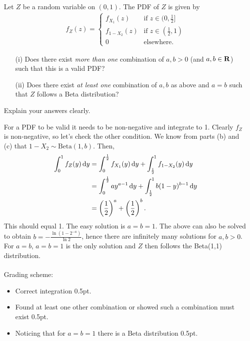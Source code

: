 \begin{exercise}[1.5]
Let $Z$ be a random variable on $(0,1)$. The PDF of $Z$ is given by
\begin{align*}
    f_Z(z) = \begin{cases}
    f_{X_1}(z)&\text{if}\,\,z\in (0,\frac12]\\
    f_{1-X_2}(z)&\text{if}\,\,z\in(\frac12,1)\\
    0 &\text{elsewhere}.
    \end{cases}
\end{align*}
\begin{enumerate}
\item[(i)] Does there exist \emph{more than one} combination of $a,b>0$ (and $a,b\in\bf{R}$) such that this is a valid PDF? 
\item[(ii)] Does there exist \emph{at least one} combination of $a,b$ as above and $a=b$ such that $Z$ follows a Beta distribution? 
\end{enumerate}
Explain your answers clearly.
\begin{solution}
For a PDF to be valid it needs to be non-negative and integrate to 1. Clearly $f_Z$ is non-negative, so let's check the other condition. We know from parts (b) and (c) that $1-X_2\sim\text{Beta}(1,b)$. Then,
\begin{align*}
    \int_{0}^{1}{f_Z(y)\,\textrm{d}y} &= \int_{0}^{\frac12}{f_{X_1}(y)\,\textrm{d}y} + \int_{\frac12}^{1}{f_{1-X_2}(y)\,\textrm{d}y}\\
    &= \int_{0}^{\frac12}{a y^{a-1}\,\textrm{d}y} + \int_{\frac12}^{1}{b (1-y)^{b-1}\,\textrm{d}y}\\
    &= \left(\frac12\right)^a + \left(\frac12\right)^b.
\end{align*}
This should equal 1. The easy solution is $a=b=1$. The above can also be solved to obtain $b = -\frac{\ln{(1-2^{-a})}}{\ln{2}}$, hence there are infinitely many solutions for $a,b>0$. For $a=b$, $a=b=1$ is the only solution and $Z$ then follows the Beta(1,1) distribution.
\\\\
Grading scheme:
\begin{itemize}
    \item Correct integration 0.5pt.
    \item Found at least one other combination or showed such a combination must exist 0.5pt.
    \item Noticing that for $a=b=1$ there is a Beta distribution 0.5pt.
\end{itemize}
\end{solution}
\end{exercise}
